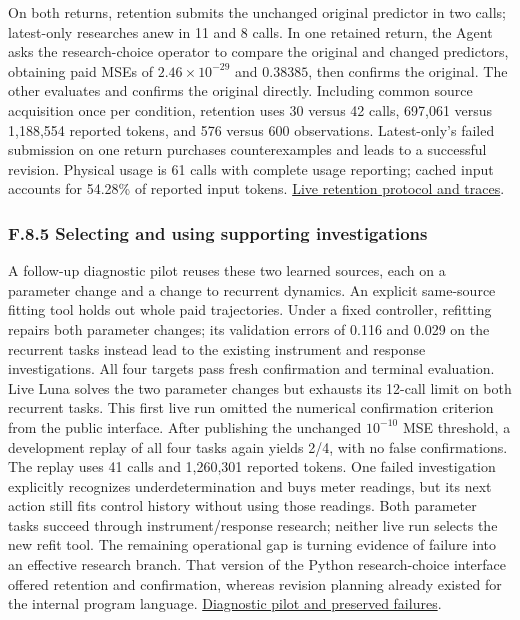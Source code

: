 \documentclass[11pt,a4paper]{article}
\begin{document}
On both returns, retention submits the unchanged original predictor in two calls;
latest-only researches anew in 11 and 8 calls. In one retained return, the Agent
asks the research-choice operator to compare the original and changed predictors,
obtaining paid MSEs of \(2.46\times10^{-29}\) and \(0.38385\), then confirms the original.
The other evaluates and confirms the original directly. Including common source
acquisition once per condition, retention uses 30 versus 42 calls, 697,061 versus
1,188,554 reported tokens, and 576 versus 600 observations. Latest-only's failed
submission on one return purchases counterexamples and leads to a successful
revision. Physical usage is 61 calls with complete usage reporting; cached input
accounts for 54.28\% of reported input tokens.
\hyperlink{artifact-80}{Live retention protocol and traces}.


\subsubsection*{F.8.5 Selecting and using supporting investigations}

A follow-up diagnostic pilot reuses these two learned sources, each on a parameter
change and a change to recurrent dynamics. An explicit same-source fitting tool
holds out whole paid trajectories. Under a fixed controller, refitting repairs
both parameter changes; its validation errors of 0.116 and 0.029 on the recurrent
tasks instead lead to the existing instrument and response investigations.
All four targets pass fresh confirmation and terminal evaluation. Live Luna
solves the two parameter changes but exhausts its 12-call limit on both recurrent
tasks. This first live run omitted the numerical confirmation criterion from the
public interface. After publishing the unchanged \(10^{-10}\) MSE threshold, a
development replay of all four tasks again yields 2/4, with no false confirmations.
The replay uses 41 calls and 1,260,301 reported tokens. One failed investigation
explicitly recognizes underdetermination and buys meter readings, but its next
action still fits control history without using those readings. Both parameter
tasks succeed through instrument/response research; neither live run selects
the new refit tool. The remaining operational gap is turning evidence of failure
into an effective research branch. That version of the Python research-choice interface
offered retention and confirmation, whereas revision planning already existed for
the internal program language.
\hyperlink{artifact-81}{Diagnostic pilot and preserved failures}.
\end{document}
